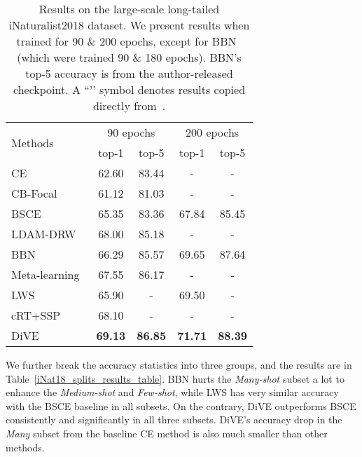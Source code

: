 \documentclass[10pt,twocolumn,letterpaper]{article}
\begin{document}
\begin{table}
   \caption{Results on the large-scale long-tailed iNaturalist2018 dataset. We present results when trained for 90 \& 200 epochs, except for BBN~\cite{zhou2020BBN} (which were trained 90 \& 180 epochs). BBN's top-5 accuracy is from the author-released checkpoint. A ``\dag’’ symbol denotes results copied directly from~\cite{cao2019LDAM}.}
   \centering
   \small
      \begin{tabular}{l|cccc}
      \hline
      \multirow{2}{*}{Methods} & \multicolumn{2}{c}{90 epochs} & \multicolumn{2}{c}{200 epochs} \\
               & top-1 & top-5 & top-1 & top-5 \\
      \hline \hline
      CE & 62.60 & 83.44 & - & -\\
      CB-Focal~\cite{cui2019classbalance} & 61.12 & 81.03 & - & -\\
      BSCE & 65.35 & 83.36 & 67.84 & 85.45\\
      \hline
      LDAM-DRW~\cite{cao2019LDAM} & 68.00 & 85.18 & - & -\\
      BBN~\cite{zhou2020BBN} & 66.29 & 85.57 & 69.65 & 87.64\\
      Meta-learning~\cite{jamal2020rethinkingclassbalance} & 67.55 & 86.17 & - & - \\
      LWS~\cite{kang2019decoupling} & 65.90 & - & 69.50 & -\\
      cRT+SSP~\cite{yang2020rethinking} & 68.10 & - &  - & - \\
      \hline
      DiVE & \textbf{69.13} & \textbf{86.85} & \textbf{71.71} & \textbf{88.39}\\
      \hline
      \end{tabular}
   \label{iNat18_results_table}
\end{table}

We further break the accuracy statistics into three groups, and the results are in Table~\ref{iNat18_splits_results_table}. BBN hurts the \emph{Many-shot} subset a lot to enhance the \emph{Medium-shot} and \emph{Few-shot}, while LWS has very similar accuracy with the BSCE baseline in all subsets. On the contrary, DiVE outperforms BSCE consistently and significantly in all three subsets. DiVE’s accuracy drop in the \emph{Many} subset from the baseline CE method is also much smaller than other methods. 
\end{document}
